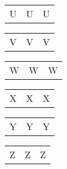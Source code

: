 \documentclass{minimal}
\begin{document}
\begin{longtable}{p{2.8cm}p{2.8cm}p{2.8cm}}
U & U & U
\end{longtable}

\begin{longtable}{p{2.8cm}p{2.8cm}p{2.8cm}}
V & V & V
\end{longtable}

\begin{longtable}{p{2.8cm}p{2.8cm}p{2.8cm}}
W & W & W
\end{longtable}

\begin{longtable}{p{2.8cm}p{2.8cm}p{2.8cm}}
X & X & X
\end{longtable}

\begin{longtable}{p{2.8cm}p{2.8cm}p{2.8cm}}
Y & Y & Y
\end{longtable}

\begin{longtable}{p{2.8cm}p{2.8cm}p{2.8cm}}
Z & Z & Z
\end{longtable}
\end{document}
